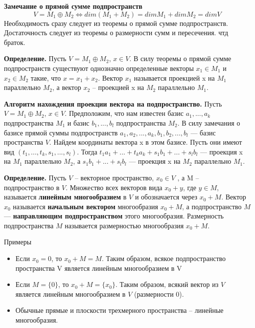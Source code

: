 \documentclass[a4paper]{article}
\begin{document}
    \begin{htheorem}
        \textbf{Замечание о прямой сумме подпространств} \begin{equation}
                                                             V = M_1 \oplus M_2 \Leftrightarrow dim(M_1 + M_2) = dim M_1 + dim M_2 = dim V
        \end{equation}
        Необходимость сразу следует из теоремы о прямой сумме подпространств.
        Достаточность следует из теоремы о размерности сумм и пересечения. чтд браток.
    \end{htheorem}

    \textbf{Определение.}  Пусть $V = M_1 \oplus M_2$, $x \in V$. В силу теоремы о прямой сумме подпространств существуют однозначно определенные векторы $x_1 \in M_1$ и
    $x_2 \in M_2$ такие, что $x = x_1 + x_2$. Вектор $x_1$ называется проекцией x на $M_1$
    параллельно $M_2$, а вектор $x_2$ – проекцией x на $M_2$ параллельно $M_1$.



    \textbf{Алгоритм нахождения проекции вектора на подпространство.} Пусть $V = M_1 \oplus M_2$, $x \in V$. Предположим, что нам известен базис $a_1, ..., a_k$ подпространства $M_1$ и базис $b_1, ..., b_l$ подпространства $M_2$. В силу замечания о базисе прямой суммы подпространств $a_1, a_2, ..., a_k, b_1, b_2, ... ,b_l$ --- базис пространства $V$. Найдем координаты вектора x в этом базисе. Пусть они имеют вид $(t_1, ..., t_k, s_1, ..., s_l)$. Тогда $t_1a_1 + ... + t_ka_k + s_1b_1 + ... + s_lb_l$ --- проекция x на $M_1$ параллельно $M_2$, а $s_1b_1 + ... + s_lb_l$ --- проекция x на $M_2$ параллельно $M_1$.


    \textbf{Определение.} Пусть $V$ – векторное пространство, $x_0 \in V$ , а M – подпространство в $V$.
    Множество всех векторов вида $x_0 + y$, где $y \in M$, называется \textbf{линейным
    многообразием} в $V$ и обозначается через $x_0 + M$. Вектор $x_0$ называется
    \textbf{начальным вектором }многообразия $x_0 + M$, а подпространство $M$ –--
    \textbf{направляющим подпространством} этого многообразия. Размерность
    подпространства $M$ называется размерностью многообразия $x_0 + M$.

    Примеры
    \begin{itemize}
        \item Если $x_0 = 0$, то $x_0 + M = M$. Таким образом, всякое
        подпространство пространства V является линейным многообразием в V
        \item Если $M = \{ 0 \}$, то $x_0 + M = \{ x_0 \}$. Таким образом, всякий
        вектор из $V$ является линейным многообразием в $V$ (размерности $0$).
        \item Обычные прямые и плоскости трехмерного пространства –
        линейные многообразия.
    \end{itemize}
\end{document}

